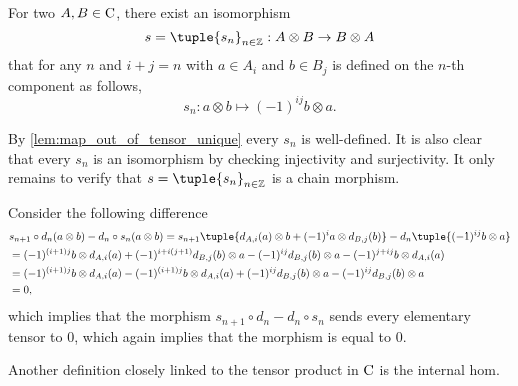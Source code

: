 \begin{remark}
    \label{rem:symmetry_tensor_product_of_chain_complex}
    For two \( A, B \in \operatorname{C} \), there exist an isomorphism
    \[
        s = \tuple{s_n}_{n \in \Zb}: A \otimes B \to B \otimes A
    \]
    that for any \( n \) and \( i + j = n \) with \( a \in A_i \) and \( b \in B_j \) is defined on the \( n \)-th component as follows,
    \[
        s_n: a \otimes b \mapsto (-1)^{ij} b \otimes a.
    \]

    By \autoref{lem:map_out_of_tensor_unique} every \( s_n \) is well-defined. It is also clear that every \( s_n \) is an isomorphism by checking injectivity and surjectivity. It only remains to verify that \( s = \tuple{s_n}_{n \in \Zb} \) is a chain morphism.

    Consider the following difference
    \begin{align*}
        &s_{n + 1} \circ d_n(a \otimes b) - d_n \circ s_n (a \otimes b) = s_{n + 1} \tuple{d_{A, i}(a) \otimes b + (-1)^i a \otimes d_{B, j}(b)} - d_n \tuple{ (-1)^{ij} b \otimes a } \\
        &= (-1)^{(i + 1)j} b \otimes d_{A, i}(a) + (-1)^{i + i(j + 1)} d_{B, j}(b) \otimes a - (-1)^{ij} d_{B, j}(b) \otimes a - (-1)^{j + ij} b \otimes d_{A, i}(a) \\
        &= (-1)^{(i + 1)j} b \otimes d_{A, i}(a) - (-1)^{(i + 1)j} b \otimes d_{A, i}(a) + (-1)^{ij} d_{B, j}(b) \otimes a - (-1)^{ij} d_{B, j}(b) \otimes a \\
        &= 0,
    \end{align*}
    which implies that the morphism \( s_{n + 1} \circ d_n - d_n \circ s_n \) sends every elementary tensor to \( 0 \), which again implies that the morphism is equal to \( 0 \).
\end{remark}

Another definition closely linked to the tensor product in \( \operatorname{C} \) is the internal hom.

